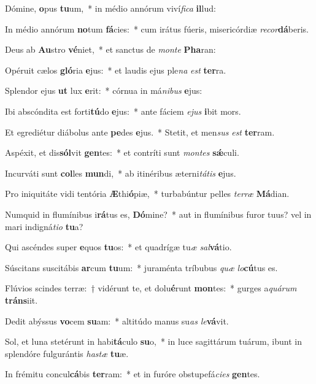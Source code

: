 \item Dómine, \textbf{o}pus \textbf{tu}um,~* in médio annórum viví\textit{fica} \textbf{il}lud:
\item In médio annórum \textbf{no}tum \textbf{fá}cies:~* cum irátus fúeris, misericórdiæ \textit{recor}\textbf{dá}beris.
\item Deus ab \textbf{Au}stro \textbf{vé}niet,~* et san\-ctus de \textit{monte} \textbf{Pha}ran:
\item Opéruit cælos \textbf{gló}ria \textbf{e}jus:~* et laudis ejus ple\textit{na} \textit{est} \textbf{ter}ra.
\item Splendor ejus \textbf{ut} lux \textbf{e}rit:~* córnua in má\hspace{0.02em}\textit{nibus} \textbf{e}jus:
\item Ibi abscóndita est forti\textbf{tú}do \textbf{e}jus:~* ante fáciem \textit{ejus} \textbf{i}bit mors.
\item Et egrediétur diábolus ante \textbf{pe}des \textbf{e}jus.~* Stetit, et men\tinyhspace\textit{sus} \textit{est} \textbf{ter}ram.
\item Aspéxit, et dis\textbf{sól}vit \textbf{gen}tes:~* et contríti sunt \textit{montes} \textbf{sǽ}culi.
\item Incurváti sunt \textbf{col}les \textbf{mun}di,~* ab itinéribus æterni\textit{tátis} \textbf{e}jus.
\item Pro iniquitáte vidi tentória \textbf{Æ}thi\textbf{ó}piæ,~* turbabúntur pelles \textit{terræ} \textbf{Má}dian.
\item Numquid in flumínibus i\textbf{rá}tus es, \textbf{Dó}mine?~* aut in flumínibus furor tuus? vel in mari indigná\textit{tio} \textbf{tu}a?
\item Qui ascéndes super \textbf{e}quos \textbf{tu}os:~* et quadrígæ tu\textit{æ} \textit{sal}\textbf{vá}tio.
\item Súscitans suscitábis \textbf{ar}cum \textbf{tu}um:~* juraménta tríbubus \textit{quæ} \textit{lo}\textbf{cú}tus es.
\item Flúvios scindes terræ:~† vidérunt te, et dolu\textbf{é}runt \textbf{mon}tes:~* gurges a\tinyhspace\textit{quárum} \textbf{tráns}iit.
\item Dedit abýssus \textbf{vo}cem \textbf{su}am:~* altitúdo manus su\tinyhspace\textit{as} \textit{le}\textbf{vá}vit.
\item Sol, et luna stetérunt in habi\textbf{tá}culo \textbf{su}o,~* in luce sagittárum tuárum, ibunt in splendóre fulgurántis \textit{hastæ} \textbf{tu}æ.
\item In frémitu concul\textbf{cá}bis \textbf{ter}ram:~* et in furóre obstupefá\textit{cies} \textbf{gen}tes.
